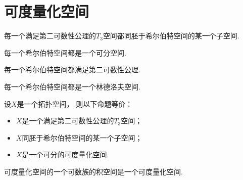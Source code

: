 \section{可度量化空间}
\begin{theorem}
每一个满足第二可数性公理的\(T_3\)空间都同胚于希尔伯特空间的某一个子空间.
\end{theorem}

\begin{theorem}
每一个希尔伯特空间都是一个可分空间.
\end{theorem}

\begin{proposition}
每一个希尔伯特空间都满足第二可数性公理.
\end{proposition}

\begin{proposition}
每一个希尔伯特空间都是一个林德洛夫空间.
\end{proposition}

\begin{theorem}
设\(X\)是一个拓扑空间，
则以下命题等价：\begin{itemize}
	\item \(X\)是一个满足第二可数性公理的\(T_3\)空间；
	\item \(X\)同胚于希尔伯特空间的某一个子空间；
	\item \(X\)是一个可分的可度量化空间.
\end{itemize}
\end{theorem}

\begin{theorem}
可度量化空间的一个可数族的积空间是一个可度量化空间.
\end{theorem}
